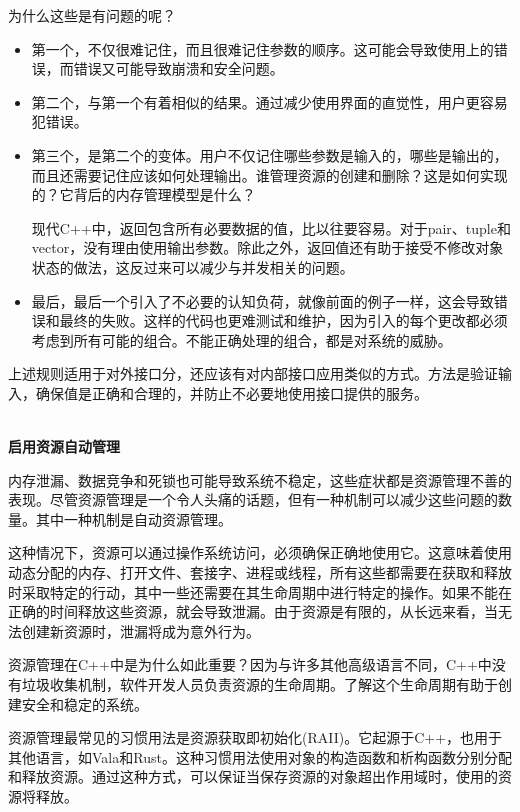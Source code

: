 为什么这些是有问题的呢？

\begin{itemize}
\item 
第一个，不仅很难记住，而且很难记住参数的顺序。这可能会导致使用上的错误，而错误又可能导致崩溃和安全问题。

\item 
第二个，与第一个有着相似的结果。通过减少使用界面的直觉性，用户更容易犯错误。

\item 
第三个，是第二个的变体。用户不仅记住哪些参数是输入的，哪些是输出的，而且还需要记住应该如何处理输出。谁管理资源的创建和删除？这是如何实现的？它背后的内存管理模型是什么？

现代C++中，返回包含所有必要数据的值，比以往要容易。对于pair、tuple和vector，没有理由使用输出参数。除此之外，返回值还有助于接受不修改对象状态的做法，这反过来可以减少与并发相关的问题。

\item 
最后，最后一个引入了不必要的认知负荷，就像前面的例子一样，这会导致错误和最终的失败。这样的代码也更难测试和维护，因为引入的每个更改都必须考虑到所有可能的组合。不能正确处理的组合，都是对系统的威胁。
\end{itemize}

上述规则适用于对外接口分，还应该有对内部接口应用类似的方式。方法是验证输入，确保值是正确和合理的，并防止不必要地使用接口提供的服务。

\hspace*{\fill} \\ %
\noindent
\textbf{启用资源自动管理}

内存泄漏、数据竞争和死锁也可能导致系统不稳定，这些症状都是资源管理不善的表现。尽管资源管理是一个令人头痛的话题，但有一种机制可以减少这些问题的数量。其中一种机制是自动资源管理。

这种情况下，资源可以通过操作系统访问，必须确保正确地使用它。这意味着使用动态分配的内存、打开文件、套接字、进程或线程，所有这些都需要在获取和释放时采取特定的行动，其中一些还需要在其生命周期中进行特定的操作。如果不能在正确的时间释放这些资源，就会导致泄漏。由于资源是有限的，从长远来看，当无法创建新资源时，泄漏将成为意外行为。 

资源管理在C++中是为什么如此重要？因为与许多其他高级语言不同，C++中没有垃圾收集机制，软件开发人员负责资源的生命周期。了解这个生命周期有助于创建安全和稳定的系统。

资源管理最常见的习惯用法是资源获取即初始化(RAII)。它起源于C++，也用于其他语言，如Vala和Rust。这种习惯用法使用对象的构造函数和析构函数分别分配和释放资源。通过这种方式，可以保证当保存资源的对象超出作用域时，使用的资源将释放。

